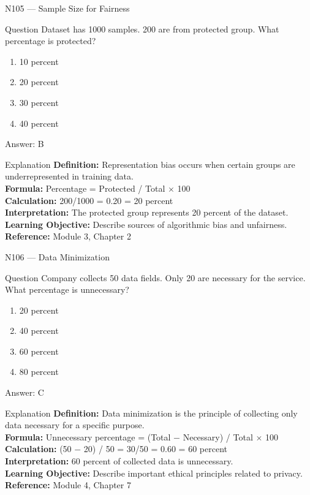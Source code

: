 \documentclass[aspectratio=169,8pt]{beamer}
\begin{document}
	\begin{frame}{N105 --- Sample Size for Fairness}
		\begin{block}{Question}
			Dataset has 1000 samples. 200 are from protected group. What percentage is protected?
			\begin{enumerate}
				\item 10 percent
				\item 20 percent
				\item 30 percent
				\item 40 percent
			\end{enumerate}
		\end{block}
		\begin{exampleblock}{Answer: B}\end{exampleblock}
		\begin{block}{Explanation}
			\textbf{Definition:} Representation bias occurs when certain groups are underrepresented in training data.\\
			\textbf{Formula:} Percentage = Protected / Total $\times$ 100\\
			\textbf{Calculation:} 200/1000 = 0.20 = 20 percent\\
			\textbf{Interpretation:} The protected group represents 20 percent of the dataset.\\
			\textbf{Learning Objective:} Describe sources of algorithmic bias and unfairness.\\
			\textbf{Reference:} Module 3, Chapter 2
		\end{block}
	\end{frame}
	
	\begin{frame}{N106 --- Data Minimization}
		\begin{block}{Question}
			Company collects 50 data fields. Only 20 are necessary for the service. What percentage is unnecessary?
			\begin{enumerate}
				\item 20 percent
				\item 40 percent
				\item 60 percent
				\item 80 percent
			\end{enumerate}
		\end{block}
		\begin{exampleblock}{Answer: C}\end{exampleblock}
		\begin{block}{Explanation}
			\textbf{Definition:} Data minimization is the principle of collecting only data necessary for a specific purpose.\\
			\textbf{Formula:} Unnecessary percentage = (Total $-$ Necessary) / Total $\times$ 100\\
			\textbf{Calculation:} (50 $-$ 20) / 50 = 30/50 = 0.60 = 60 percent\\
			\textbf{Interpretation:} 60 percent of collected data is unnecessary.\\
			\textbf{Learning Objective:} Describe important ethical principles related to privacy.\\
			\textbf{Reference:} Module 4, Chapter 7
		\end{block}
	\end{frame}
	
\end{document}

